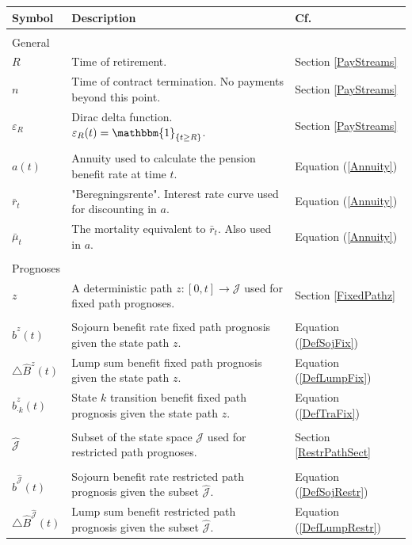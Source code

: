 \documentclass{article}
\newcommand{\1}[1]{\mathbbm{1}_{\left\lbrace #1 \right\rbrace}}
\theoremstyle{break}
\theoremstyle{remark}
\numberwithin{equation}{section}
\begin{document}
\begin{table}[H]
	\begin{tabular}{lll}
		\hline
		\textbf{Symbol}	& \textbf{Description} & \textbf{Cf.}  \\
		\hline
		&&\\
		General&&\\
		\hline
		$R$& Time of retirement. & Section \ref{PayStreams}\\
		$n$& Time of contract termination. No payments beyond this point. & Section \ref{PayStreams}\\
		$\varepsilon_{R}$& Dirac delta function. $\varepsilon_{R}(t) = \1{t \geq R}$. & Section \ref{PayStreams}\\
		&&\\
		$a(t)$	& Annuity used to calculate the pension benefit rate at time $t$. & Equation (\ref{Annuity}) \\
		$\bar{r}_t$	& "Beregningsrente". Interest rate curve used for discounting in $a$. & Equation (\ref{Annuity}) \\
		$\bar{\mu}_t$	& The mortality equivalent to $\bar{r}_t$. Also used in $a$.  & Equation (\ref{Annuity}) \\
		&&\\
		Prognoses&&\\
		\hline
		$z$	& A deterministic path $z: [0,t] \to \mathcal{J}$ used for fixed path prognoses. & Section \ref{FixedPathz} \\
		&&\\
		$\hat{b}^z(t)$ & Sojourn benefit rate fixed path prognosis given the state path $z$. & Equation (\ref{DefSojFix}) \\
		$ \triangle \hat{B}^z(t) $& Lump sum benefit fixed path prognosis given the state path $z$. & Equation (\ref{DefLumpFix}) \\
		$ \hat{b}_{\cdot k}^z(t) $& State $k$ transition benefit fixed path prognosis given the state path $z$. & Equation (\ref{DefTraFix}) \\
		&&\\
		$\hat{\mathcal{J}}$	& Subset of the state space $\mathcal{J}$ used for restricted path prognoses. & Section \ref{RestrPathSect} \\
		&&\\
		$\hat{b}^{\hat{\mathcal{J}}}(t)$ & Sojourn benefit rate restricted path prognosis given the subset $\hat{\mathcal{J}}$. & Equation (\ref{DefSojRestr}) \\
		$ \triangle \hat{B}^{\hat{\mathcal{J}}}(t) $& Lump sum benefit restricted path prognosis given the subset $\hat{\mathcal{J}}$. & Equation (\ref{DefLumpRestr}) \\

\end{tabular}
\end{table}
\end{document}
